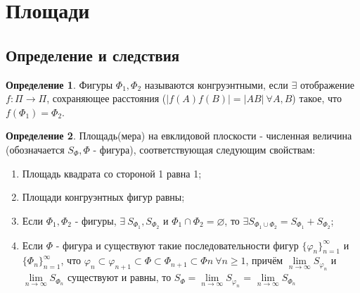 \documentclass[a4paper, 12pt]{article}
\renewcommand{\phi}{\varphi}
\theoremstyle{definition}
\newtheorem*{definition}{Определение}
\begin{document}
	\section{Площади}
	\subsection{Определение и следствия}
	\begin{definition}
		Фигуры $\Phi_{1}, \Phi_{2}$ называются конгруэнтными, если $\exists$ отображение $f: \Pi \rightarrow \Pi$, сохраняющее расстояния ($|f(A)f(B)| = |AB| \ \forall A, B$) такое, что $f(\Phi_{1}) = \Phi_{2}$.
	\end{definition}
	\begin{definition}
		Площадь(мера) на евклидовой плоскости - численная величина (обозначается $S_{\Phi}, \Phi$ - фигура), соответствующая следующим свойствам:
		\begin{enumerate}
			\item Площадь квадрата со стороной 1 равна 1;
			\item Площади конгруэнтных фигур равны;
			\item Если $\Phi_{1}, \Phi_{2}$ - фигуры, $\exists \ S_{\Phi_{1}}, S_{\Phi_{2}}$ и $\Phi_{1} \cap \Phi_{2} = \varnothing$, то $\exists S_{\Phi_{1}\cup\Phi_{2}} = S_{\Phi_{1}} + S_{\Phi_{2}}$; 
			\item Если $\Phi$ - фигура и существуют такие последовательности фигур $\{\phi_{n}\}_{n=1}^{\infty}$ и $\{\Phi_{n}\}_{n=1}^{\infty}$, что $\phi_{n} \subset \phi_{n+1} \subset \Phi \subset \Phi_{n+1} \subset \Phi{n} \ \forall n \geqslant 1$, причём $\lim \limits_{n\rightarrow\infty}S_{\phi_{n}}$ и $\lim \limits_{n\rightarrow\infty}S_{\Phi_{n}}$ существуют и равны, то $S_{\Phi} = \lim \limits_{n\rightarrow\infty}S_{\phi_{n}}$ = $\lim \limits_{n\rightarrow\infty}S_{\Phi_{n}}$
		\end{enumerate} 
	\end{definition}
\end{document}
